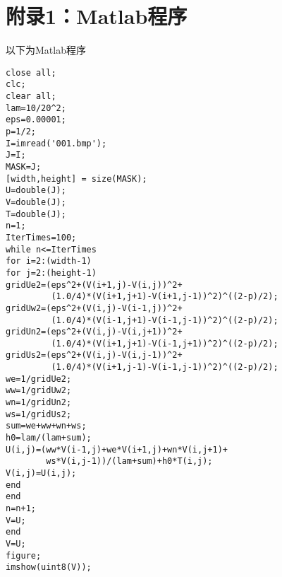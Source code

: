 \section*{附录1：Matlab程序}
以下为Matlab程序
\begin{lstlisting}[frame=trBL]
close all;
clc;
clear all;
lam=10/20^2;
eps=0.00001;
p=1/2;
I=imread('001.bmp');
J=I;
MASK=J;
[width,height] = size(MASK);
U=double(J);
V=double(J);
T=double(J);
n=1;
IterTimes=100;
while n<=IterTimes
for i=2:(width-1)
for j=2:(height-1)
gridUe2=(eps^2+(V(i+1,j)-V(i,j))^2+
         (1.0/4)*(V(i+1,j+1)-V(i+1,j-1))^2)^((2-p)/2);
gridUw2=(eps^2+(V(i,j)-V(i-1,j))^2+
         (1.0/4)*(V(i-1,j+1)-V(i-1,j-1))^2)^((2-p)/2);
gridUn2=(eps^2+(V(i,j)-V(i,j+1))^2+
         (1.0/4)*(V(i+1,j+1)-V(i-1,j+1))^2)^((2-p)/2);
gridUs2=(eps^2+(V(i,j)-V(i,j-1))^2+
         (1.0/4)*(V(i+1,j-1)-V(i-1,j-1))^2)^((2-p)/2);
we=1/gridUe2;
ww=1/gridUw2;
wn=1/gridUn2;
ws=1/gridUs2;
sum=we+ww+wn+ws;
h0=lam/(lam+sum);
U(i,j)=(ww*V(i-1,j)+we*V(i+1,j)+wn*V(i,j+1)+
        ws*V(i,j-1))/(lam+sum)+h0*T(i,j);
V(i,j)=U(i,j);
end
end
n=n+1;
V=U;
end
V=U;
figure;
imshow(uint8(V));
\end{lstlisting}